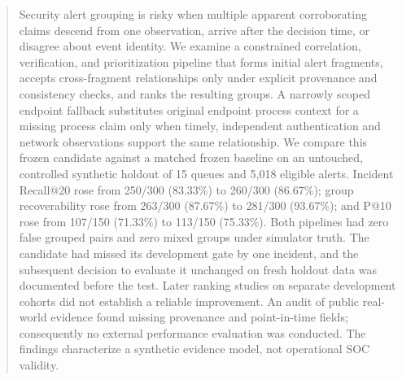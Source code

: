 \begin{abstract}\RaggedRight
Security alert grouping is risky when multiple apparent corroborating claims descend from one observation, arrive after the decision time, or disagree about event identity. We examine a constrained correlation, verification, and prioritization pipeline that forms initial alert fragments, accepts cross-fragment relationships only under explicit provenance and consistency checks, and ranks the resulting groups. A narrowly scoped endpoint fallback substitutes original endpoint process context for a missing process claim only when timely, independent authentication and network observations support the same relationship. We compare this frozen candidate against a matched frozen baseline on an untouched, controlled synthetic holdout of 15 queues and 5,018 eligible alerts. Incident Recall@20 rose from 250/300 (83.33\%) to 260/300 (86.67\%); group recoverability rose from 263/300 (87.67\%) to 281/300 (93.67\%); and P@10 rose from 107/150 (71.33\%) to 113/150 (75.33\%). Both pipelines had zero false grouped pairs and zero mixed groups under simulator truth. The candidate had missed its development gate by one incident, and the subsequent decision to evaluate it unchanged on fresh holdout data was documented before the test. Later ranking studies on separate development cohorts did not establish a reliable improvement. An audit of public real-world evidence found missing provenance and point-in-time fields; consequently no external performance evaluation was conducted. The findings characterize a synthetic evidence model, not operational SOC validity.
\end{abstract}
